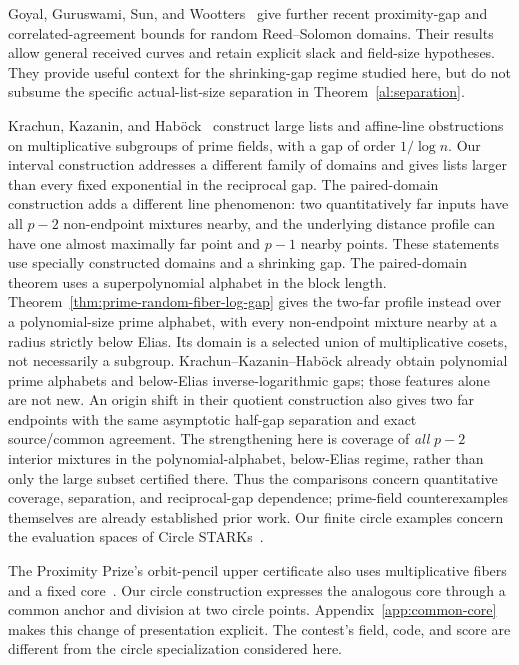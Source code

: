 \documentclass[11pt,letterpaper]{article}
\theoremstyle{definition}
\theoremstyle{remark}
\begin{document}
Goyal, Guruswami, Sun, and Wootters~\cite{ggsw} give further recent
proximity-gap and correlated-agreement bounds for random Reed--Solomon
domains. Their results allow general received curves and retain explicit
slack and field-size hypotheses. They provide useful context for the
shrinking-gap regime studied here, but do not subsume the specific
actual-list-size separation in Theorem~\ref{al:separation}.

Krachun, Kazanin, and Hab\"ock~\cite{kkh} construct large lists and
affine-line obstructions on multiplicative subgroups of prime fields,
with a gap of order $1/\log n$. Our interval construction addresses
a different family of domains and gives lists larger than every fixed
exponential in the reciprocal gap. The paired-domain construction adds
a different line phenomenon: two quantitatively far inputs have all
$p-2$ non-endpoint mixtures nearby, and the underlying distance profile
can have one almost maximally far point and $p-1$ nearby points. These
statements use specially constructed domains and a shrinking gap.
The paired-domain theorem uses a superpolynomial alphabet in the block
length. Theorem~\ref{thm:prime-random-fiber-log-gap} gives the two-far
profile instead over a polynomial-size prime alphabet, with every
non-endpoint mixture nearby at a radius strictly below Elias. Its
domain is a selected union of multiplicative cosets, not necessarily a
subgroup. Krachun--Kazanin--Hab\"ock already obtain polynomial prime
alphabets and below-Elias inverse-logarithmic gaps; those features alone
are not new. An origin shift in their quotient construction also gives
two far endpoints with the same asymptotic half-gap separation and exact
source/common agreement. The strengthening here is coverage of
\emph{all} $p-2$ interior mixtures in the polynomial-alphabet,
below-Elias regime, rather than only the large subset certified there.
Thus the comparisons concern quantitative coverage, separation, and reciprocal-gap dependence;
prime-field counterexamples themselves are already established prior work.
Our finite circle examples concern the evaluation spaces of
Circle STARKs~\cite{circle}.

The Proximity Prize's orbit-pencil upper certificate also uses
multiplicative fibers and a fixed core~\cite{orbit-pencil}. Our circle
construction expresses the analogous core through a common anchor and
division at two circle points. Appendix~\ref{app:common-core} makes this
change of presentation explicit. The contest's field, code, and score
are different from the circle specialization considered here.
\end{document}
